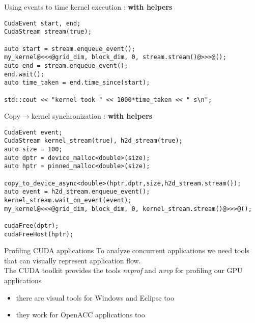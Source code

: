 \begin{frame}[fragile]{}
    \begin{code}{Using events to time kernel execution : \textbf{with helpers}}
        \begin{lstlisting}[style=boxcudatiny]
CudaEvent start, end;
CudaStream stream(true);

auto start = stream.enqueue_event();
my_kernel@<<<@grid_dim, block_dim, 0, stream.stream()@>>>@();
auto end = stream.enqueue_event();
end.wait();
auto time_taken = end.time_since(start);

std::cout << "kernel took " << 1000*time_taken << " s\n";
        \end{lstlisting}
    \end{code}
    \begin{code}{Copy$\rightarrow$kernel synchronization : \textbf{with helpers}}
        \begin{lstlisting}[style=boxcudatiny]
CudaEvent event;
CudaStream kernel_stream(true), h2d_stream(true);
auto size = 100;
auto dptr = device_malloc<double>(size);
auto hptr = pinned_malloc<double>(size);

copy_to_device_async<double>(hptr,dptr,size,h2d_stream.stream());
auto event = h2d_stream.enqueue_event();
kernel_stream.wait_on_event(event);
my_kernel@<<<@grid_dim, block_dim, 0, kernel_stream.stream()@>>>@();

cudaFree(dptr);
cudaFreeHost(hptr);
        \end{lstlisting}
    \end{code}
\end{frame}

\begin{frame}[fragile]{}
    \begin{info}{Profiling CUDA applications}
        To analyze concurrent applications we need tools that can visually represent application flow.
        \\
        The CUDA toolkit provides the tools \emph{nvprof} and \emph{nvvp} for profiling our GPU applications
        \begin{itemize}
            \item there are visual tools for Windows and Eclipse too
            \item they work for OpenACC applications too
        \end{itemize}
    \end{info}

\end{frame}

